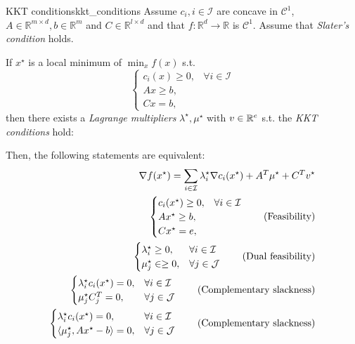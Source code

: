 \begin{theorem}{KKT conditions}{kkt_conditions}
  Assume \(c_i, i \in \mathcal{I}\) are concave in \(\mathcal{C}^1\),
  \(A\in \mathbb{R}^{m \times d}, b \in \mathbb{R}^m\) and \(C\in \mathbb{R}^{l \times d}\) and that \(f:\mathbb{R}^d \to \mathbb{R}\) is \(\mathcal{C}^1\). Assume that \emph{Slater's condition} holds.

  If \(x^\star\) is a local minimum of \(\min_x f(x)\) s.t.
  \[
    \begin{cases}
      c_i(x) \geq 0, & \forall i \in \mathcal{I} \\
      Ax \geq b,     &                           \\
      Cx = b,        &
    \end{cases}
  \]
  then there exists a \emph{Lagrange multipliers} \(\lambda^\star, \mu^\star\) with \(v \in \mathbb{R}^e\) s.t. the \emph{KKT conditions} hold:

  Then, the following statements are equivalent:
  \begin{align}
    \nabla f(x^\star) = \sum_{i\in \mathcal{I}} \lambda_i^\star \nabla c_i(x^\star) + A^T \mu^\star + C^T v^\star \\
    \begin{cases}
      c_i(x^\star) \geq 0, & \forall i \in \mathcal{I} \\
      Ax^\star \geq b,     &                           \\
      Cx^\star = e,        &                           \\
    \end{cases} \tag{Feasibility}                                                              \\
    \begin{cases}
      \lambda_i^\star \geq 0, & \forall i \in \mathcal{I} \\
      \mu_j^\star \in \geq 0, & \forall j \in \mathcal{J} \\
    \end{cases} \tag{Dual feasibility}                                                           \\
    \begin{cases}
      \lambda_i^\star c_i(x^\star) = 0, & \forall i \in \mathcal{I} \\
      \mu_j^\star C_j^T = 0,            & \forall j \in \mathcal{J} \\
    \end{cases} \tag{Complementary slackness}                                                 \\
    \begin{cases}
      \lambda_i^\star c_i(x^\star) = 0,      & \forall i \in \mathcal{I} \\
      \langle\mu_j^\star, Ax^\star - b\rangle = 0, & \forall j \in \mathcal{J} \\
    \end{cases} \tag{Complementary slackness}
  \end{align}
\end{theorem}

